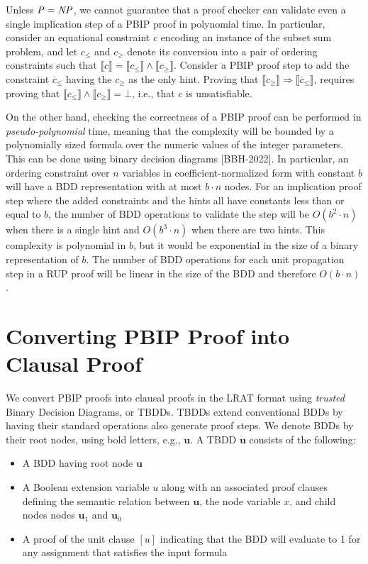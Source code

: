 \documentclass{easychair}
\newcommand{\nil}{\bot}
\renewcommand{\obar}[1]{\overline{#1}}
\newcommand{\trust}[1]{\dot {#1}}
\newcommand{\imply}{\Rightarrow}
\newcommand{\func}[1]{\llbracket#1\rrbracket}
\newcommand{\node}[1]{\mathbf{#1}}
\newcommand{\nodeu}{\node{u}}
\begin{document}
Unless ${\it P} = {\it NP}$, we cannot guarantee that a proof checker
can validate even a single implication step of a PBIP proof in polynomial time.
In particular, consider an equational constraint $c$ encoding an
instance of the subset sum problem, and let $c_{\leq}$ and $c_{\geq}$
denote its conversion into a pair of ordering constraints such that
$\func{c} = \func{c_{\leq}} \land \func{c_{\geq}}$.  Consider a PBIP
proof step to add the constraint $\obar{c}_{\leq}$ having the 
$c_{\geq}$ as the only hint.  Proving that
$\func{c_{\geq}} \imply \func{\obar{c}_{\leq}}$, requires proving that
$\func{c_{\leq}} \land \func{c_{\geq}} = \nil$, i.e., that $c$ is unsatisfiable.

On the other hand, checking the correctness of a PBIP proof can be
performed in {\em pseudo-polynomial} time, meaning that the complexity
will be bounded by a polynomially sized formula over the numeric
values of the integer parameters.  This can be done using binary
decision diagrams [BBH-2022].  In particular, an ordering constraint
over $n$ variables in coefficient-normalized form with constant $b$
will have a BDD representation with at most $b \cdot n$ nodes.  For an
implication proof step where the added constraints and the hints all
have constants less than or equal to $b$, the number of BDD operations
to validate the step will be $O(b^{2} \cdot n)$ when there is a single
hint and $O(b^{3} \cdot n)$ when there are two hints.  This complexity
is polynomial in $b$, but it would be exponential in the size of a
binary representation of $b$.  The number of BDD operations
for each unit propagation step in a RUP proof will be linear in the
size of the BDD and therefore $O(b \cdot n)$\@.


\section{Converting PBIP Proof into Clausal Proof}

We convert PBIP proofs into clausal proofs in the LRAT format using
{\em trusted} Binary Decision Diagrams, or TBDDs.  TBDDs extend
conventional BDDs by having their standard operations also generate proof steps.
We denote BDDs by their root nodes, using bold letters, e.g., $\nodeu$.
A TBDD $\trust{\nodeu}$ consists of the following:
\begin{itemize}
\item A BDD having root node $\nodeu$
\item A Boolean extension variable $u$ along with an associated
  proof clauses defining the semantic relation between $\nodeu$,  the node variable $x$, and 
  child nodes
  nodes $\nodeu_1$ and $\nodeu_0$
\item A proof of the unit clause $[u]$ indicating that the BDD will evaluate to 1 for any assignment that satisfies the input formula
\end{itemize}
\end{document}
